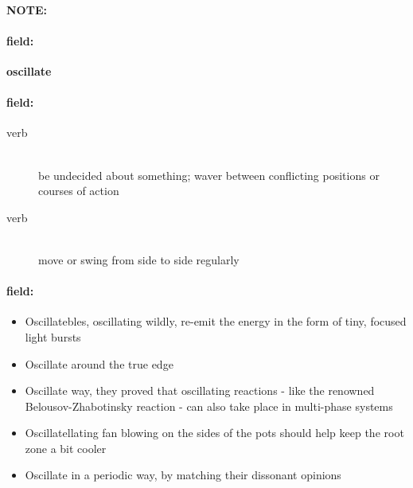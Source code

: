 \documentclass[12pt]{article}
\newenvironment{note}{\paragraph{NOTE:}}{}
\newenvironment{field}{\paragraph{field:}}{}
\begin{document}
\begin{note}
\begin{field}
\textbf{\large oscillate}
\end{field}


\begin{field}
\begin{description}
\item[verb] \hfill \\ 
be undecided about something; waver between conflicting positions or courses of action

\item[verb] \hfill \\ 
move or swing from side to side regularly

\end{description}
\end{field}

\begin{field}
\begin{itemize}
\item Oscillatebles, oscillating wildly, re-emit the energy in the form of tiny, focused light bursts
\item Oscillate around the true edge
\item Oscillate way, they proved that oscillating reactions - like the renowned Belousov-Zhabotinsky reaction - can also take place in multi-phase systems
\item Oscillatellating fan blowing on the sides of the pots should help keep the root zone a bit cooler
\item Oscillate in a periodic way, by matching their dissonant opinions
\end{itemize}
\end{field}
\end{note}
\end{document}
